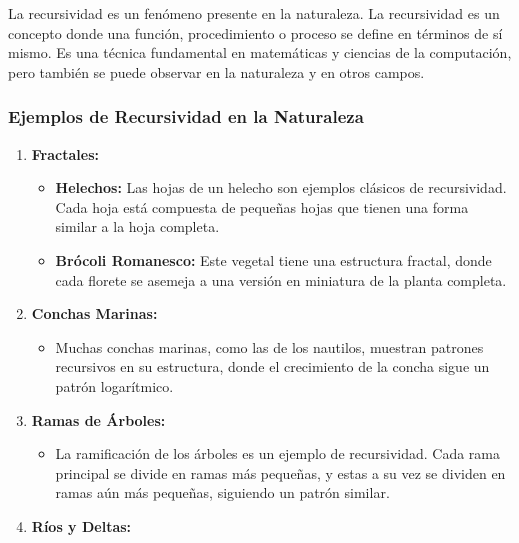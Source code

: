 La recursividad es un fenómeno presente en la naturaleza. La
recursividad es un concepto donde una función, procedimiento o proceso
se define en términos de sí mismo. Es una técnica fundamental en
matemáticas y ciencias de la computación, pero también se puede observar
en la naturaleza y en otros campos.

\subsubsection{Ejemplos de Recursividad en la Naturaleza}

\begin{enumerate}

\item
  \textbf{Fractales:}

  \begin{itemize}

  \item
    \textbf{Helechos:} Las hojas de un helecho son ejemplos clásicos de
    recursividad. Cada hoja está compuesta de pequeñas hojas que tienen
    una forma similar a la hoja completa.
  \item
    \textbf{Brócoli Romanesco:} Este vegetal tiene una estructura
    fractal, donde cada florete se asemeja a una versión en miniatura de
    la planta completa.
  \end{itemize}
\item
  \textbf{Conchas Marinas:}

  \begin{itemize}
  
  \item
    Muchas conchas marinas, como las de los nautilos, muestran patrones
    recursivos en su estructura, donde el crecimiento de la concha sigue
    un patrón logarítmico.
  \end{itemize}
\item
  \textbf{Ramas de Árboles:}

  \begin{itemize}
  
  \item
    La ramificación de los árboles es un ejemplo de recursividad. Cada
    rama principal se divide en ramas más pequeñas, y estas a su vez se
    dividen en ramas aún más pequeñas, siguiendo un patrón similar.
  \end{itemize}
\item
  \textbf{Ríos y Deltas:}

  \begin{itemize}
  

\end{itemize}
\end{enumerate}
